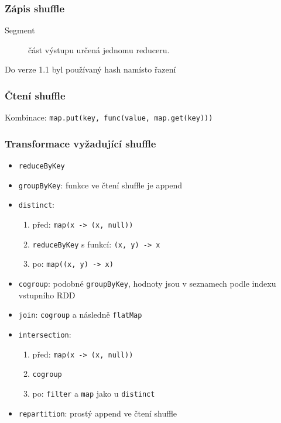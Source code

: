 \documentclass[xcolor=dvipsnames,compact]{beamer}
\begin{document}
\begin{frame}
	\frametitle{Zápis shuffle}
	\begin{description}
		\item[Segment] část výstupu určená jednomu reduceru.
	\end{description}

	\begin{center}
	\end{center}

	Do verze 1.1 byl používaný hash namísto řazení
\end{frame}

\begin{frame}[fragile]
	\frametitle{Čtení shuffle}
	
	\begin{center}
	\end{center}

	Kombinace: \verb|map.put(key, func(value, map.get(key)))|
\end{frame}

\begin{frame}[fragile]
	\frametitle{Transformace vyžadující shuffle}
	\begin{itemize}
		\item \verb|reduceByKey|
		\item \verb|groupByKey|: funkce ve čtení shuffle je append
		\item \verb|distinct|:
		\begin{enumerate}
			\item před: \verb|map(x -> (x, null))|
			\item \verb|reduceByKey| s funkcí: \verb|(x, y) -> x|
			\item po: \verb|map((x, y) -> x)|
		\end{enumerate}
		\item \verb|cogroup|: podobné \verb|groupByKey|, hodnoty jsou v seznamech podle indexu vstupního RDD
		\item \verb|join|: \verb|cogroup| a následně \verb|flatMap|
		\item \verb|intersection|:
		\begin{enumerate}
			\item před: \verb|map(x -> (x, null))|
			\item \verb|cogroup|
			\item po: \verb|filter| a \verb|map| jako u \verb|distinct|
		\end{enumerate}
		\item \verb|repartition|: prostý append ve čtení shuffle
	\end{itemize}
\end{frame}
\end{document}
